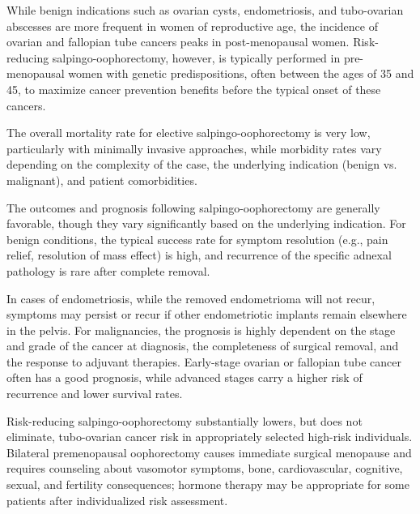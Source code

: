 While benign indications such as ovarian cysts, endometriosis, and tubo-ovarian abscesses are more frequent in women of reproductive age, the incidence of ovarian and fallopian tube cancers peaks in post-menopausal women. Risk-reducing salpingo-oophorectomy, however, is typically performed in pre-menopausal women with genetic predispositions, often between the ages of 35 and 45, to maximize cancer prevention benefits before the typical onset of these cancers. 

The overall mortality rate for elective salpingo-oophorectomy is very low, particularly with minimally invasive approaches, while morbidity rates vary depending on the complexity of the case, the underlying indication (benign vs. malignant), and patient comorbidities.

The outcomes and prognosis following salpingo-oophorectomy are generally favorable, though they vary significantly based on the underlying indication. For benign conditions, the typical success rate for symptom resolution (e.g., pain relief, resolution of mass effect) is high, and recurrence of the specific adnexal pathology is rare after complete removal. 

In cases of endometriosis, while the removed endometrioma will not recur, symptoms may persist or recur if other endometriotic implants remain elsewhere in the pelvis. For malignancies, the prognosis is highly dependent on the stage and grade of the cancer at diagnosis, the completeness of surgical removal, and the response to adjuvant therapies. Early-stage ovarian or fallopian tube cancer often has a good prognosis, while advanced stages carry a higher risk of recurrence and lower survival rates. 

Risk-reducing salpingo-oophorectomy substantially lowers, but does not eliminate, tubo-ovarian cancer risk in appropriately selected high-risk individuals. Bilateral premenopausal oophorectomy causes immediate surgical menopause and requires counseling about vasomotor symptoms, bone, cardiovascular, cognitive, sexual, and fertility consequences; hormone therapy may be appropriate for some patients after individualized risk assessment.

